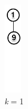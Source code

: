 \documentclass[13pt]{beamer}
\begin{document}
\begin{frame}
\begin{columns}[T]
\begin{column}[T]{3.3cm}
\begin{figure}
      \end{figure}
      \centering
    \end{column}
    \begin{column}[T]{3.3cm} %
      \begin{figure}
        \caption{\textit{k} = 1}
        \includegraphics[height=4cm]{./img/order1.png}
      \end{figure}
    \end{column}
  \end{columns}

\end{frame}
\end{document}
